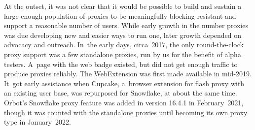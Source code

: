 \documentclass[letterpaper,twocolumn]{article}
\begin{document}
At the outset, it was not clear
that it would be possible to build and sustain
a large enough population of proxies
to be meaningfully blocking resistant
and support a reasonable number of users.
While early growth in the number proxies
was due developing new and easier ways to run one,
later growth depended on advocacy and outreach.
In~the early days, circa~2017,
the only round-the-clock proxy support was
a few standalone proxies,
run by us for the benefit of alpha testers.
A~page with the web badge existed,
but did not get enough traffic to produce proxies reliably.
The WebExtension was first made available in mid-2019.
It~got early assistance when Cupcake,
a~browser extension for flash proxy with an existing user base,
was repurposed for Snowflake, at about the same time.
Orbot's Snowflake proxy feature was added in version 16.4.1 in February~2021,
though it was counted with the standalone proxies
until becoming its own proxy type in January~2022.
\end{document}
